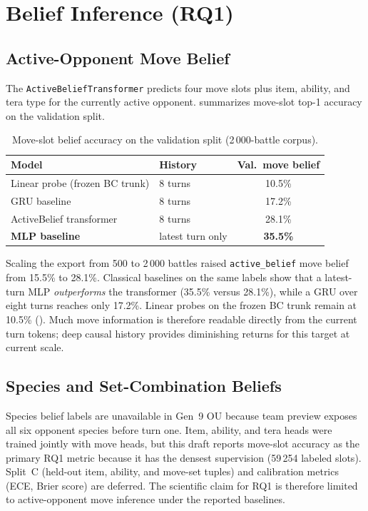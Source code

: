 \section{Belief Inference (RQ1)}

\subsection{Active-Opponent Move Belief}

The \texttt{ActiveBeliefTransformer} predicts four move slots plus item, ability,
and tera type for the currently active opponent.  summarizes
move-slot top-1 accuracy on the validation split.

\begin{table}[ht]
  \centering
  \caption{Move-slot belief accuracy on the validation split (2\,000-battle corpus).}
  \label{tab:belief-move}
  \begin{tabular}{llc}
    \toprule
    Model & History & Val.\ move belief \\
    \midrule
    Linear probe (frozen BC trunk) & 8 turns & 10.5\% \\
    GRU baseline & 8 turns & 17.2\% \\
    ActiveBelief transformer & 8 turns & 28.1\% \\
  \textbf{MLP baseline} & latest turn only & \textbf{35.5\%} \\
    \bottomrule
  \end{tabular}
\end{table}

Scaling the export from 500 to 2\,000 battles raised \texttt{active\_belief} move
belief from 15.5\% to 28.1\%. Classical baselines on the same labels show that a
latest-turn MLP \emph{outperforms} the transformer (35.5\% versus 28.1\%), while a
GRU over eight turns reaches only 17.2\%. Linear probes on the frozen BC trunk
remain at 10.5\% (). Much move information is therefore
readable directly from the current turn tokens; deep causal history provides
diminishing returns for this target at current scale.

\subsection{Species and Set-Combination Beliefs}

Species belief labels are unavailable in Gen~9 OU because team preview exposes
all six opponent species before turn one. Item, ability, and tera heads were
trained jointly with move heads, but this draft reports move-slot accuracy as
the primary RQ1 metric because it has the densest supervision (59\,254 labeled
slots). Split~C (held-out item, ability, and move-set tuples) and calibration
metrics (ECE, Brier score) are deferred. The scientific claim for RQ1 is
therefore limited to active-opponent move inference under the reported baselines.

